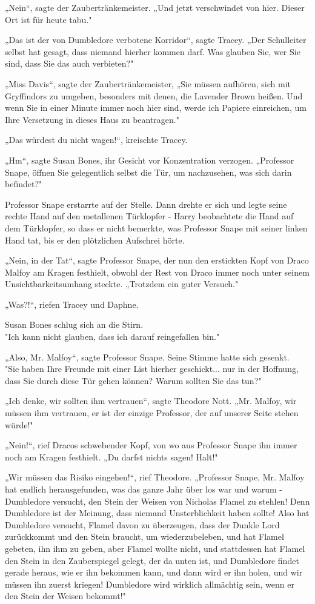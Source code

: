 {„Nein“, sagte der Zaubertränkemeister. „Und jetzt verschwindet von hier. Dieser Ort ist für heute tabu."

„Das ist der von Dumbledore verbotene Korridor“, sagte Tracey. „Der Schulleiter selbst hat gesagt, dass niemand hierher kommen darf. Was glauben Sie, wer Sie sind, dass Sie das auch verbieten?"

„Miss Davis“, sagte der Zaubertränkemeister, „Sie müssen aufhören, sich mit Gryffindors zu umgeben, besonders mit denen, die Lavender Brown heißen. Und wenn Sie in einer Minute immer noch hier sind, werde ich Papiere einreichen, um Ihre Versetzung in dieses Haus zu beantragen."

„Das würdest du nicht wagen!“, kreischte Tracey.

„Hm“, sagte Susan Bones, ihr Gesicht vor Konzentration verzogen. „Professor Snape, öffnen Sie gelegentlich selbst die Tür, um nachzusehen, was sich darin befindet?"

Professor Snape erstarrte auf der Stelle. Dann drehte er sich und legte seine rechte Hand auf den metallenen Türklopfer - Harry beobachtete die Hand auf dem Türklopfer, so dass er nicht bemerkte, was Professor Snape mit seiner linken Hand tat, bis er den plötzlichen Aufschrei hörte.

„Nein, in der Tat“, sagte Professor Snape, der nun den erstickten Kopf von Draco Malfoy am Kragen festhielt, obwohl der Rest von Draco immer noch unter seinem Unsichtbarkeitsumhang steckte. „Trotzdem ein guter Versuch."

„Was?!“, riefen Tracey und Daphne.

Susan Bones schlug sich an die Stirn.\\ "Ich kann nicht glauben, dass ich darauf reingefallen bin."

„Also, Mr. Malfoy“, sagte Professor Snape. Seine Stimme hatte sich gesenkt.\\ "Sie haben Ihre Freunde mit einer List hierher geschickt... nur in der Hoffnung, dass Sie durch diese Tür gehen können? Warum sollten Sie das tun?"

„Ich denke, wir sollten ihm vertrauen“, sagte Theodore Nott. „Mr. Malfoy, wir müssen ihm vertrauen, er ist der einzige Professor, der auf unserer Seite stehen würde!"

„Nein!“, rief Dracos schwebender Kopf, von wo aus Professor Snape ihn immer noch am Kragen festhielt. „Du darfst nichts sagen! Halt!"

„Wir müssen das Risiko eingehen!“, rief Theodore. „Professor Snape, Mr. Malfoy hat endlich herausgefunden, was das ganze Jahr über los war und warum - Dumbledore versucht, den Stein der Weisen von Nicholas Flamel zu stehlen! Denn Dumbledore ist der Meinung, dass niemand Unsterblichkeit haben sollte! Also hat Dumbledore versucht, Flamel davon zu überzeugen, dass der Dunkle Lord zurückkommt und den Stein braucht, um wiederzubeleben, und hat Flamel gebeten, ihn ihm zu geben, aber Flamel wollte nicht, und stattdessen hat Flamel den Stein in den Zauberspiegel gelegt, der da unten ist, und Dumbledore findet gerade heraus, wie er ihn bekommen kann, und dann wird er ihn holen, und wir müssen ihn zuerst kriegen! Dumbledore wird wirklich allmächtig sein, wenn er den Stein der Weisen bekommt!"

}
